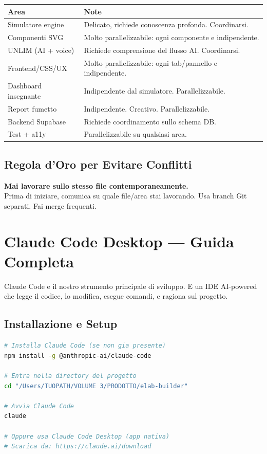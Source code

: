 \documentclass[11pt,a4paper]{article}
\begin{document}
\begin{tabularx}{\textwidth}{lX}
\toprule
\textbf{Area} & \textbf{Note} \\
\midrule
Simulatore engine & Delicato, richiede conoscenza profonda. Coordinarsi. \\
Componenti SVG & Molto parallelizzabile: ogni componente e indipendente. \\
UNLIM (AI + voice) & Richiede comprensione del flusso AI. Coordinarsi. \\
Frontend/CSS/UX & Molto parallelizzabile: ogni tab/pannello e indipendente. \\
Dashboard insegnante & Indipendente dal simulatore. Parallelizzabile. \\
Report fumetto & Indipendente. Creativo. Parallelizzabile. \\
Backend Supabase & Richiede coordinamento sullo schema DB. \\
Test + a11y & Parallelizzabile su qualsiasi area. \\
\bottomrule
\end{tabularx}

\subsection{Regola d'Oro per Evitare Conflitti}

\begin{attenzione}
\textbf{Mai lavorare sullo stesso file contemporaneamente.}\\
Prima di iniziare, comunica su quale file/area stai lavorando. Usa branch Git separati. Fai merge frequenti.
\end{attenzione}

\section{Claude Code Desktop --- Guida Completa}

Claude Code e il nostro strumento principale di sviluppo. E un IDE AI-powered che legge il codice, lo modifica, esegue comandi, e ragiona sul progetto.

\subsection{Installazione e Setup}

\begin{lstlisting}[language=bash, title=Setup iniziale]
# Installa Claude Code (se non gia presente)
npm install -g @anthropic-ai/claude-code

# Entra nella directory del progetto
cd "/Users/TUOPATH/VOLUME 3/PRODOTTO/elab-builder"

# Avvia Claude Code
claude

# Oppure usa Claude Code Desktop (app nativa)
# Scarica da: https://claude.ai/download
\end{lstlisting}
\end{document}
